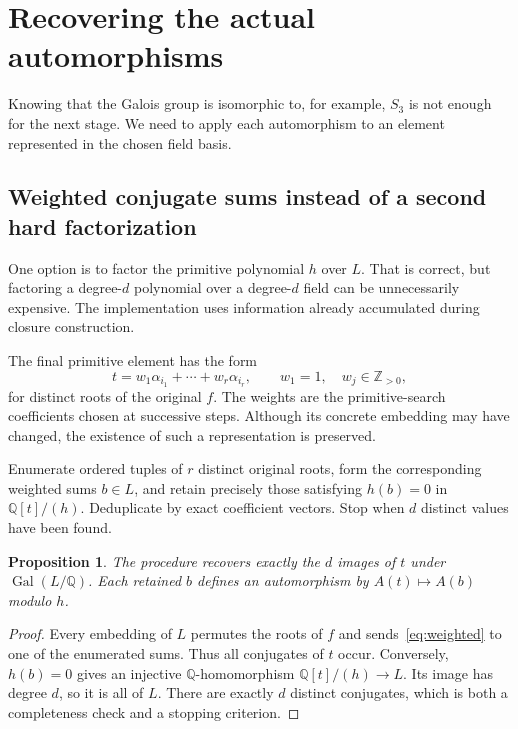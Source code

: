 \documentclass[11pt]{article}
\newtheorem{proposition}[theorem]{Proposition}
\theoremstyle{definition}\newtheorem{definition}[theorem]{Definition}
\theoremstyle{remark}\newtheorem{remark}[theorem]{Remark}
\newcommand{\Q}{\mathbb Q}\newcommand{\C}{\mathbb C}\newcommand{\Z}{\mathbb Z}
\DeclareMathOperator{\Gal}{Gal}\DeclareMathOperator{\Res}{Res}
\begin{document}
\section{Recovering the actual automorphisms}\label{sec:autos}

Knowing that the Galois group is isomorphic to, for example, $S_3$ is not enough
for the next stage. We need to apply each automorphism to an element represented
in the chosen field basis.

\subsection{Weighted conjugate sums instead of a second hard factorization}

One option is to factor the primitive polynomial $h$ over $L$. That is correct,
but factoring a degree-$d$ polynomial over a degree-$d$ field can be unnecessarily
expensive. The implementation uses information already accumulated during
closure construction.

The final primitive element has the form
\begin{equation}\label{eq:weighted}
 t=w_1\alpha_{i_1}+\cdots+w_r\alpha_{i_r},
 \qquad w_1=1,\quad w_j\in\Z_{>0},
\end{equation}
for distinct roots of the original $f$. The weights are the primitive-search
coefficients chosen at successive steps. Although its concrete embedding may
have changed, the existence of such a representation is preserved.

Enumerate ordered tuples of $r$ distinct original roots, form the corresponding
weighted sums $b\in L$, and retain precisely those satisfying $h(b)=0$ in
$\Q[t]/(h)$. Deduplicate by exact coefficient vectors. Stop when $d$ distinct
values have been found.

\begin{proposition}\label{prop:autos}
The procedure recovers exactly the $d$ images of $t$ under $\Gal(L/\Q)$.
Each retained $b$ defines an automorphism by $A(t)\mapsto A(b)$ modulo $h$.
\end{proposition}
\begin{proof}
Every embedding of $L$ permutes the roots of $f$ and sends~\eqref{eq:weighted}
to one of the enumerated sums. Thus all conjugates of $t$ occur. Conversely,
$h(b)=0$ gives an injective $\Q$-homomorphism $\Q[t]/(h)\to L$. Its image has
degree $d$, so it is all of $L$. There are exactly $d$ distinct conjugates,
which is both a completeness check and a stopping criterion.
\end{proof}
\end{document}
